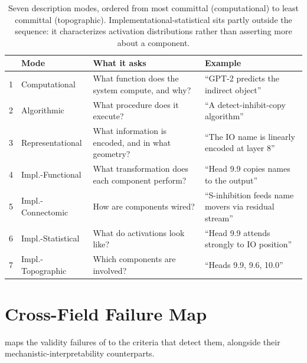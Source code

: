 \documentclass{article}
\begin{document}
\begin{table}[H]
\centering
\small
\caption{Seven description modes, ordered from most committal (computational) to least committal (topographic). Implementational-statistical sits partly outside the sequence: it characterizes activation distributions rather than asserting more about a component.}
\label{tab:modes}
\renewcommand{\arraystretch}{1.15}
\begin{tabular}{@{}rl>{\raggedright\arraybackslash}p{4.2cm}>{\raggedright\arraybackslash}p{4.6cm}@{}}
\toprule
& \textbf{Mode} & \textbf{What it asks} & \textbf{Example} \\
\midrule
1 & Computational & What function does the system compute, and why? & ``GPT-2 predicts the indirect object'' \\
2 & Algorithmic & What procedure does it execute? & ``A detect-inhibit-copy algorithm'' \\
3 & Representational & What information is encoded, and in what geometry? & ``The IO name is linearly encoded at layer 8'' \\
4 & Impl.-Functional & What transformation does each component perform? & ``Head 9.9 copies names to the output'' \\
5 & Impl.-Connectomic & How are components wired? & ``S-inhibition feeds name movers via residual stream'' \\
6 & Impl.-Statistical & What do activations look like? & ``Head 9.9 attends strongly to IO position'' \\
7 & Impl.-Topographic & Which components are involved? & ``Heads 9.9, 9.6, 10.0'' \\
\bottomrule
\end{tabular}
\end{table}

\section{Cross-Field Failure Map}
\label{appendix:cross-science}

 maps the validity failures of  to the criteria that detect them, alongside their mechanistic-interpretability counterparts.
\end{document}
